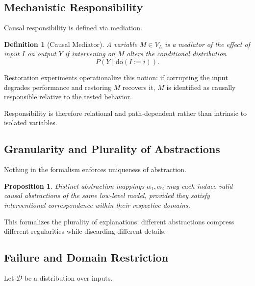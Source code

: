\documentclass[11pt]{article}
\newtheorem{definition}{Definition}
\newtheorem{proposition}{Proposition}
\begin{document}
\subsection{Mechanistic Responsibility}

Causal responsibility is defined via mediation.

\begin{definition}[Causal Mediator]
A variable $M \in V_L$ is a mediator of the effect of input $I$ on output $Y$ if intervening on $M$ alters the conditional distribution
\[
P(Y \mid \mathrm{do}(I := i)).
\]
\end{definition}

Restoration experiments operationalize this notion: if corrupting the input degrades performance and restoring $M$ recovers it, $M$ is identified as causally responsible relative to the tested behavior.

Responsibility is therefore relational and path-dependent rather than intrinsic to isolated variables.

\subsection{Granularity and Plurality of Abstractions}

Nothing in the formalism enforces uniqueness of abstraction.

\begin{proposition}
Distinct abstraction mappings $\alpha_1, \alpha_2$ may each induce valid causal abstractions of the same low-level model, provided they satisfy interventional correspondence within their respective domains.
\end{proposition}

This formalizes the plurality of explanations: different abstractions compress different regularities while discarding different details.

\subsection{Failure and Domain Restriction}

Let $\mathcal{D}$ be a distribution over inputs.
\end{document}
